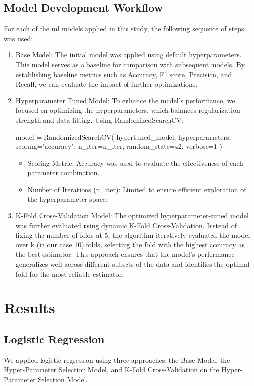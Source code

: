 \subsection{Model Development Workflow}
For each of the \acrshort{ml} models applied in this study, the following sequence of steps was used:
\begin{enumerate}
\item Base Model:
The initial model was applied using default hyperparameters. This model serves as a baseline for comparison with subsequent models. By establishing baseline metrics such as Accuracy, F1 score, Precision, and Recall, we can evaluate the impact of further optimizations.

\item Hyperparameter Tuned Model:
To enhance the model’s performance, we focused on optimizing the hyperparameters, which balances regularization strength and data fitting. Using RandomizedSearchCV\cite{RandomizedSearchCV}:
\begin{python}
model = RandomizedSearchCV(
        hypertuned_model, 
        hyperparameters, 
        scoring="accuracy", 
        n_iter=n_iter, 
        random_state=42,  
        verbose=1
    )
\end{python}

\begin{itemize} \item Scoring Metric: Accuracy was used to evaluate the effectiveness of each parameter combination. \item Number of Iterations (n\_iter): Limited to ensure efficient exploration of the hyperparameter space. \end{itemize}

\item K-Fold Cross-Validation Model:
The optimized hyperparameter-tuned model was further evaluated using dynamic K-Fold Cross-Validation. Instead of fixing the number of folds at 5, the algorithm iteratively evaluated the model over k (in our case 10) folds, selecting the fold with the highest accuracy as the best estimator. This approach ensures that the model's performance generalizes well across different subsets of the data and identifies the optimal fold for the most reliable estimator.
\end{enumerate}

\section{Results}
\subsection{Logistic Regression}
We applied logistic regression using three approaches: the Base Model, the Hyper-Parameter Selection Model, and K-Fold Cross-Validation on the Hyper-Parameter Selection Model. 

